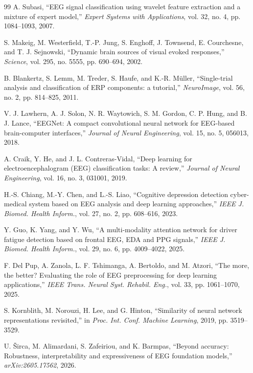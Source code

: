 \documentclass[conference]{IEEEtran}
\begin{document}
\begin{thebibliography}{99}
A. Subasi, ``EEG signal classification using wavelet feature extraction and a mixture of expert model,'' \emph{Expert Systems with Applications}, vol. 32, no. 4, pp. 1084--1093, 2007.

S. Makeig, M. Westerfield, T.-P. Jung, S. Enghoff, J. Townsend, E. Courchesne, and T. J. Sejnowski, ``Dynamic brain sources of visual evoked responses,'' \emph{Science}, vol. 295, no. 5555, pp. 690--694, 2002.

B. Blankertz, S. Lemm, M. Treder, S. Haufe, and K.-R. M\"uller, ``Single-trial analysis and classification of ERP components: a tutorial,'' \emph{NeuroImage}, vol. 56, no. 2, pp. 814--825, 2011.

V. J. Lawhern, A. J. Solon, N. R. Waytowich, S. M. Gordon, C. P. Hung, and B. J. Lance, ``EEGNet: A compact convolutional neural network for EEG-based brain-computer interfaces,'' \emph{Journal of Neural Engineering}, vol. 15, no. 5, 056013, 2018.

A. Craik, Y. He, and J. L. Contreras-Vidal, ``Deep learning for electroencephalogram (EEG) classification tasks: A review,'' \emph{Journal of Neural Engineering}, vol. 16, no. 3, 031001, 2019.

H.-S. Chiang, M.-Y. Chen, and L.-S. Liao, ``Cognitive depression detection cyber-medical system based on EEG analysis and deep learning approaches,'' \emph{IEEE J. Biomed. Health Inform.}, vol. 27, no. 2, pp. 608--616, 2023.

Y. Guo, K. Yang, and Y. Wu, ``A multi-modality attention network for driver fatigue detection based on frontal EEG, EDA and PPG signals,'' \emph{IEEE J. Biomed. Health Inform.}, vol. 29, no. 6, pp. 4009--4022, 2025.

F. Del Pup, A. Zanola, L. F. Tshimanga, A. Bertoldo, and M. Atzori, ``The more, the better? Evaluating the role of EEG preprocessing for deep learning applications,'' \emph{IEEE Trans. Neural Syst. Rehabil. Eng.}, vol. 33, pp. 1061--1070, 2025.

S. Kornblith, M. Norouzi, H. Lee, and G. Hinton, ``Similarity of neural network representations revisited,'' in \emph{Proc. Int. Conf. Machine Learning}, 2019, pp. 3519--3529.

U. \v{S}irca, M. Alimardani, S. Zafeiriou, and K. Barmpas, ``Beyond accuracy: Robustness, interpretability and expressiveness of EEG foundation models,'' \emph{arXiv:2605.17562}, 2026.


\end{thebibliography}
\end{document}
